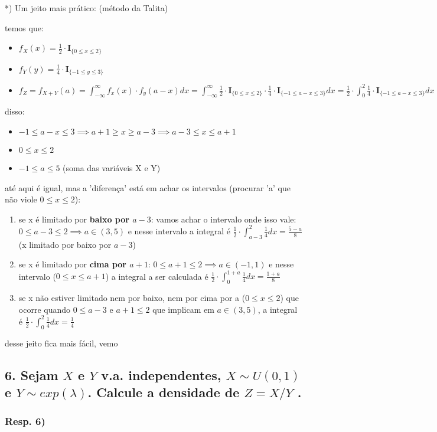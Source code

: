\documentclass[portuguese]{article}
\begin{document}
{*}) Um jeito mais prático: (método da Talita)

temos que:
\begin{itemize}
\item $f_{X}(x)=\frac{1}{2}\cdot\mathbf{I}_{\{0\leq x\leq2\}}$
\item $f_{Y}(y)=\frac{1}{4}\cdot\mathbf{I}_{\{-1\leq y\leq3\}}$
\item $f_{Z}=f_{X+Y}(a)=\int_{-\infty}^{\infty}f_{x}(x)\cdot f_{y}(a-x)dx=\int_{-\infty}^{\infty}\frac{1}{2}\cdot\mathbf{I}_{\{0\leq x\leq2\}}\cdot\frac{1}{4}\cdot\mathbf{I}_{\{-1\leq a-x\leq3\}}dx=\frac{1}{2}\cdot\int_{0}^{2}\frac{1}{4}\cdot\mathbf{I}_{\{-1\leq a-x\leq3\}}dx$
\end{itemize}
disso:
\begin{itemize}
\item $-1\leq a-x\leq3\implies a+1\geq x\geq a-3\implies a-3\leq x\leq a+1$
\item $0\leq x\leq2$
\item $-1\leq a\leq5$ (soma das variáveis X e Y)
\end{itemize}
até aqui é igual, mas a 'diferença' está em achar os intervalos (procurar
'a' que não viole $0\leq x\leq2$):
\begin{enumerate}
\item se x é limitado por \textbf{baixo por $a-3$}: vamos achar o intervalo
onde isso vale: $0\leq a-3\leq2\implies a\in(3,5)$ e nesse intervalo
a integral é $\frac{1}{2}\cdot\int_{a-3}^{2}\frac{1}{4}dx=\frac{5-a}{8}$
(x limitado por baixo por $a-3$)
\item se x é limitado por \textbf{cima por $a+1$}: $0\leq a+1\leq2\implies a\in(-1,1)$
e nesse intervalo ($0\leq x\leq a+1$) a integral a ser calculada
é $\frac{1}{2}\cdot\int_{0}^{1+a}\frac{1}{4}dx=\frac{1+a}{8}$
\item se x não estiver limitado nem por baixo, nem por cima por a ($0\leq x\leq2$)
que ocorre quando $0\leq a-3$ e $a+1\leq2$ que implicam em $a\in(3,5)$,
a integral é $\frac{1}{2}\cdot\int_{0}^{2}\frac{1}{4}dx=\frac{1}{4}$
\end{enumerate}
desse jeito fica mais fácil, vemo


\subsection*{\textmd{6. Sejam $X$ e $Y$ v.a. independentes, $X\sim U(0,1)$
e $Y\sim exp(\lambda)$. Calcule a densidade de $Z=X/Y$ . }}


\subsubsection*{\textmd{Resp. 6)}}
\end{document}
